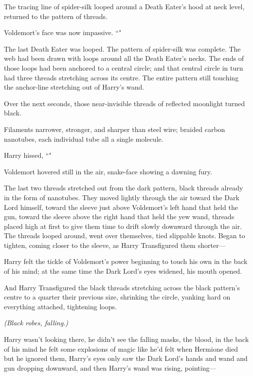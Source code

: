 The tracing line of spider-silk looped around a Death Eater's hood at neck level, returned to the pattern of threads.

Voldemort's face was now impassive. ``"

The last Death Eater was looped. The pattern of spider-silk was complete. The web had been drawn with loops around all the Death Eater's necks. The ends of those loops had been anchored to a central circle; and that central circle in turn had three threads stretching across its centre. The entire pattern still touching the anchor-line stretching out of Harry's wand.

Over the next seconds, those near-invisible threads of reflected moonlight turned black.

Filaments narrower, stronger, and sharper than steel wire; braided carbon nanotubes, each individual tube all a single molecule.

Harry hissed, ``"

Voldemort hovered still in the air, snake-face showing a dawning fury.

The last two threads stretched out from the dark pattern, black threads already in the form of nanotubes. They moved lightly through the air toward the Dark Lord himself, toward the sleeve just above Voldemort's left hand that held the gun, toward the sleeve above the right hand that held the yew wand, threads placed high at first to give them time to drift slowly downward through the air. The threads looped around, went over themselves, tied slippable knots. Began to tighten, coming closer to the sleeve, as Harry Transfigured them shorter—

Harry felt the tickle of Voldemort's power beginning to touch his own in the back of his mind; at the same time the Dark Lord's eyes widened, his mouth opened.

And Harry Transfigured the black threads stretching across the black pattern's centre to a quarter their previous size, shrinking the circle, yanking hard on everything attached, tightening loops.

\emph{(Black robes, falling.)}

Harry wasn't looking there, he didn't see the falling masks, the blood, in the back of his mind he felt some explosions of magic like he'd felt when Hermione died but he ignored them, Harry's eyes only saw the Dark Lord's hands and wand and gun dropping downward, and then Harry's wand was rising, pointing—

